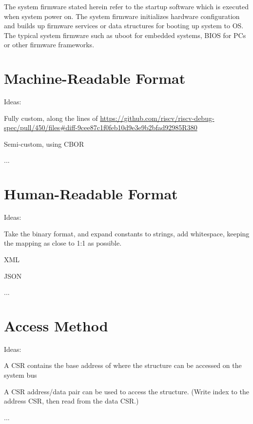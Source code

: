 \begin{commentary}
The system firmware stated herein refer to the startup software which is executed
when system power on. The system firmware initializes hardware configuration and
builds up firmware services or data structures for booting up system to OS. The typical
system firmware such as uboot for embedded systems, BIOS for PCs or other firmware
frameworks.
\end{commentary}

\chapter{Machine-Readable Format}

\begin{steps}{Ideas:}
\item Fully custom, along the lines of
    \url{https://github.com/riscv/riscv-debug-spec/pull/450/files#diff-9cee87c1f0feb10d9e3e9b2bfad92985R380}
\item Semi-custom, using CBOR
\item ...
\end{steps}

\chapter{Human-Readable Format}

\begin{steps}{Ideas:}
\item Take the binary format, and expand constants to strings, add whitespace,
keeping the mapping as close to 1:1 as possible.
\item XML
\item JSON
\item ...
\end{steps}

\chapter{Access Method}
\label{sec:AccessMethod}

\begin{steps}{Ideas:}
\item A CSR contains the base address of where the structure can be accessed on
the system bus
\item A CSR address/data pair can be used to access the structure. (Write index
to the address CSR, then read from the data CSR.)
\item ...
\end{steps}
